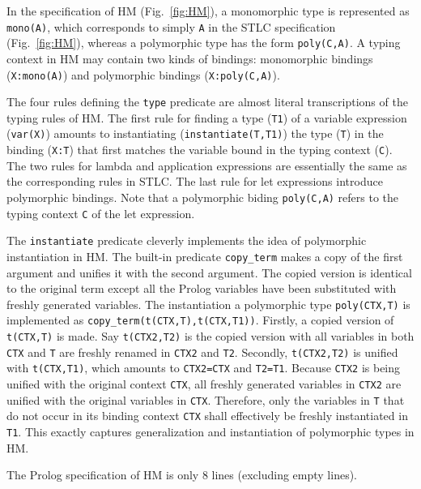 \documentclass[runningheads,a4paper]{llncs}
\begin{document}
In the specification of HM (Fig.~\ref{fig:HM}), a monomorphic type
is represented as \verb|mono(A)|, which corresponds to simply \verb|A|
in the STLC specification (Fig.~\ref{fig:HM}), whereas a polymorphic type
has the form \verb|poly(C,A)|. A typing context in HM may contain
two kinds of bindings: monomorphic bindings (\verb|X:mono(A)|) and
polymorphic bindings (\verb|X:poly(C,A)|).

The four rules defining the \verb|type| predicate are almost literal
transcriptions of the typing rules of HM. The first rule for finding
a type (\verb|T1|) of a variable expression (\verb|var(X)|) amounts
to instantiating (\verb|instantiate(T,T1)|) the type (\verb|T|)
in the binding (\verb|X:T|) that first matches the variable
bound in the typing context (\verb|C|).
The two rules for lambda and application expressions are essentially
the same as the corresponding rules in STLC.
The last rule for let expressions introduce polymorphic bindings.
Note that a polymorphic biding \verb|poly(C,A)| refers to
the typing context \verb|C| of the let expression.

The \verb|instantiate| predicate
cleverly implements the idea of polymorphic instantiation in HM.
The built-in predicate \verb|copy_term| makes a copy of the first argument
and unifies it with the second argument. The copied version is identical to
the original term except all the Prolog variables have been substituted with
freshly generated variables. The instantiation a polymorphic type
\verb|poly(CTX,T)| is implemented as \verb|copy_term(t(CTX,T),t(CTX,T1))|.
Firstly, a copied version of \verb|t(CTX,T)| is made. Say \verb|t(CTX2,T2)|
is the copied version with all variables in both \verb|CTX| and \verb|T|
are freshly renamed in \verb|CTX2| and \verb|T2|. Secondly, \verb|t(CTX2,T2)|
is unified with \verb|t(CTX,T1)|, which amounts to \verb|CTX2=CTX| and
\verb|T2=T1|. Because \verb|CTX2| is being unified with the original
context \verb|CTX|, all freshly generated variables in \verb|CTX2| are
unified with the original variables in \verb|CTX|. Therefore, only
the variables in \verb|T| that do not occur in its binding context
\verb|CTX| shall effectively be freshly instantiated in \verb|T1|.
This exactly captures generalization and instantiation of
polymorphic types in HM.

The Prolog specification of HM is only 8 lines (excluding empty lines).
\end{document}
